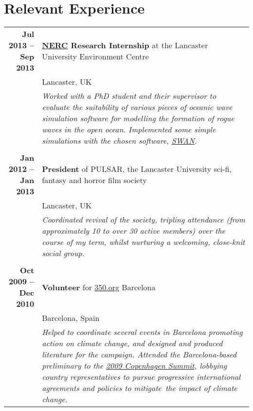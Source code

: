 \documentclass[a4paper,10pt]{article} %
\begin{document}
\section{\SC Relevant Experience}
\centering
\begin{tabularx}{\textwidth}{r|X}
\textbf{Jul 2013 --  Sep 2013} & \textbf{\href{http://www.nerc.ac.uk/}{NERC} Research Internship} at the Lancaster University Environment Centre \\
                                             & Lancaster, UK \\
                                             & \footnotesize{\emph{Worked with a PhD student and their supervisor to evaluate the suitability of various pieces of oceanic wave simulation software for modelling the formation of rogue waves in the open ocean. Implemented some simple simulations with the chosen software, \href{http://swanmodel.sourceforge.net/}{SWAN}.}} \\
\multicolumn{2}{r}{} \\
\textbf{Jan 2012 -- Jan 2013} & \textbf{President} of PULSAR, the Lancaster University sci-fi, fantasy and horror film society \\
                             & Lancaster, UK \\
                             & \footnotesize{\emph{Coordinated revival of the society, tripling attendance (from approximately 10 to over 30
                               active members) over the course of my term, whilst nurturing a welcoming, close-knit social group.}} \\
\multicolumn{2}{r}{} \\
\textbf{Oct 2009 -- Dec 2010} & \textbf{Volunteer} for {\href{http://www.350.org}{350.org} Barcelona}\\
                                   & Barcelona, Spain\\
                                   & \footnotesize\emph{Helped to coordinate several events in Barcelona
                                     promoting action on climate change, and designed and produced literature for the campaign. Attended the
                                     Barcelona-based preliminary to the \href{https://en.wikipedia.org/wiki/Copenhagen_Summit}{2009 Copenhagen Summit}, lobbying country representatives to pursue progressive international agreements and policies to mitigate\ the impact of climate change.}
\end{tabularx}

\end{document}
